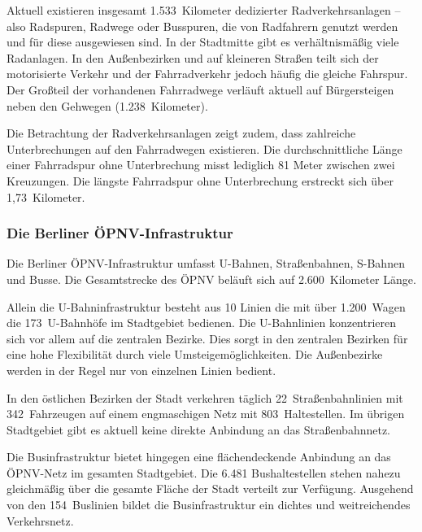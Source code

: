 Aktuell existieren insgesamt 1.533~Kilometer dedizierter Radverkehrsanlagen – also Radspuren, Radwege oder Busspuren, die von Radfahrern genutzt werden und für diese ausgewiesen sind. In der Stadtmitte gibt es verhältnismäßig viele Radanlagen. In den Außenbezirken und auf kleineren Straßen teilt sich der motorisierte Verkehr und der Fahrradverkehr jedoch häufig die gleiche Fahrspur. Der Großteil der vorhandenen Fahrradwege verläuft aktuell auf Bürgersteigen neben den Gehwegen (1.238~Kilometer).


Die Betrachtung der Radverkehrsanlagen zeigt zudem, dass zahlreiche Unterbrechungen auf den Fahrradwegen existieren. Die durchschnittliche Länge einer Fahrradspur ohne Unterbrechung misst lediglich 81 Meter zwischen zwei Kreuzungen. Die längste Fahrradspur ohne Unterbrechung erstreckt sich über 1,73~Kilometer.

\subsubsection{Die Berliner ÖPNV-Infrastruktur}

Die Berliner ÖPNV-Infrastruktur umfasst U-Bahnen, Straßenbahnen, S-Bahnen und Busse. Die Gesamtstrecke des ÖPNV beläuft sich auf 2.600~Kilometer Länge.


Allein die U-Bahninfrastruktur besteht aus 10 Linien die mit über 1.200~Wagen die 173~U-Bahnhöfe im Stadtgebiet bedienen. Die U-Bahnlinien konzentrieren sich vor allem auf die zentralen Bezirke. Dies sorgt in den zentralen Bezirken für eine hohe Flexibilität durch viele Umsteigemöglichkeiten. Die Außenbezirke werden in der Regel nur von einzelnen Linien bedient.

In den östlichen Bezirken der Stadt verkehren täglich 22~Straßenbahnlinien mit 342~Fahrzeugen auf einem engmaschigen Netz mit 803~Haltestellen. Im übrigen Stadtgebiet gibt es aktuell keine direkte Anbindung an das Straßenbahnnetz.

Die Businfrastruktur bietet hingegen eine flächendeckende Anbindung an das ÖPNV-Netz im gesamten Stadtgebiet. Die 6.481 Bushaltestellen stehen nahezu gleichmäßig über die gesamte Fläche der Stadt verteilt zur Verfügung. Ausgehend von den 154~Buslinien bildet die Businfrastruktur ein dichtes und weitreichendes Verkehrsnetz.

